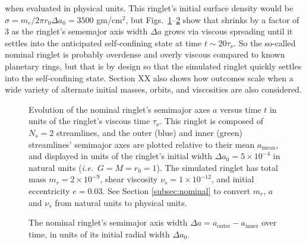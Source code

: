 \documentclass[preprint]{aastex62}
\begin{document}
when evaluated in physical units. 
This ringlet's initial surface density would be $\sigma=m_r/2\pi r_0\Delta a_0=3500$ gm/cm$^2$, but
Figs.\ \ref{fig:a_nominal}--\ref{fig:da_nominal} show that shrinks by a factor of 3 as the 
ringlet's sememajor axis width $\Delta a$ grows via viscous spreading until it settles into
the anticipated self-confining state at time $t\sim20\tau_\nu$.
So the so-called nominal ringlet is probably overdense and overly viscous compared to known planetary rings,
but that is by design so that the simulated ringlet quickly settles into the self-confining state.
Section XX also shows how outcomes scale when a wide variety of alternate initial masses, orbits,
and viscosities are also considered.

\begin{figure}
\caption{Evolution of the nominal ringlet's semimajor axes $a$
versus time $t$ in units of the ringlet's viscous time $\tau_\nu$.
This ringlet is composed of $N_s=2$ streamlines,
and the outer (blue) and inner (green) streamlines' semimajor axes are plotted relative
to their mean $a_{\text{mean}}$, and displayed in units of the ringlet's
initial width $\Delta a_0 = 5\times10^{-4}$ in natural units ({\it i.e.}\ $G=M=r_0=1$).
The simulated ringlet has total mass $m_r=2\times10^{-9}$, shear viscosity $\nu_s=1\times10^{-12}$,
and initial eccentricity $e=0.03$. See Section \ref{subsec:nominal} to convert
$m_r$, $a$ and $\nu_s$ from natural units to physical units.
\label{fig:a_nominal}}
\end{figure}

\begin{figure}
\caption{
\label{fig:da_nominal}
The nominal ringlet's semimajor axis width $\Delta a = a_{\text{outer}} - a_{\text{inner}}$ over time, 
in units of its initial radial width $\Delta a_0$.}
\end{figure}
\end{document}
